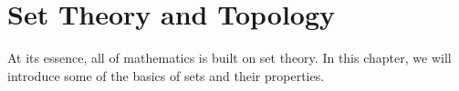 \chapter{Set Theory and Topology}

At its essence, all of mathematics is built on set theory.  In this chapter, we will introduce some of the basics of sets and their properties.
